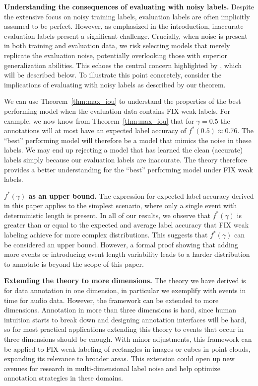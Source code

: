 \textbf{Understanding the consequences of evaluating with noisy labels.}
Despite the extensive focus on noisy training labels, evaluation labels are often implicitly assumed to be perfect. However, as emphasized in the introduction, inaccurate evaluation labels present a significant challenge. Crucially, when noise is present in both training and evaluation data, we risk selecting models that merely replicate the evaluation noise, potentially overlooking those with superior generalization abilities. This echoes the central concern highlighted by \citet{Görnitz2014}, which will be described below. To illustrate this point concretely, consider the implications of evaluating with noisy labels as described by our theorem.

We can use Theorem~\ref{thm:max_iou} to understand the properties of the best performing model when the evaluation data contains FIX weak labels. For example, we now know from Theorem~\ref{thm:max_iou} that for $\gamma=0.5$ the annotations will at most have an expected label accuracy of $f^*(0.5) \approx 0.76$. The ``best'' performing model will therefore be a model that mimics the noise in these labels. We may end up rejecting a model that has learned the clean (accurate) labels simply because our evaluation labels are inaccurate. The theory therefore provides a better understanding for the ``best'' performing model under FIX weak labels.

\textbf{$f^*(\gamma)$ as an upper bound.}
The expression for expected label accuracy derived in this paper applies to the simplest scenario, where only a single event with deterministic length is present. In all of our results, we observe that $f^*(\gamma)$ is greater than or equal to the expected and average label accuracy that FIX weak labeling achieve for more complex distributions. This suggests that $f^*(\gamma)$ can be considered an upper bound. However, a formal proof showing that adding more events or introducing event length variability leads to a harder distribution to annotate is beyond the scope of this paper.

\textbf{Extending the theory to more dimensions.}
The theory we have derived is for data annotation in one dimension, in particular we exemplify with events in time for audio data. However, the framework can be extended to more dimensions. Annotation in more than three dimensions is hard, since human intuition starts to break down and designing annotation interfaces will be hard, so for most practical applications extending this theory to events that occur in three dimensions should be enough. With minor adjustments, this framework can be applied to FIX weak labeling of rectangles in images or cubes in point clouds, expanding its relevance to broader areas. This extension could open up new avenues for research in multi-dimensional label noise and help optimize annotation strategies in these domains.

